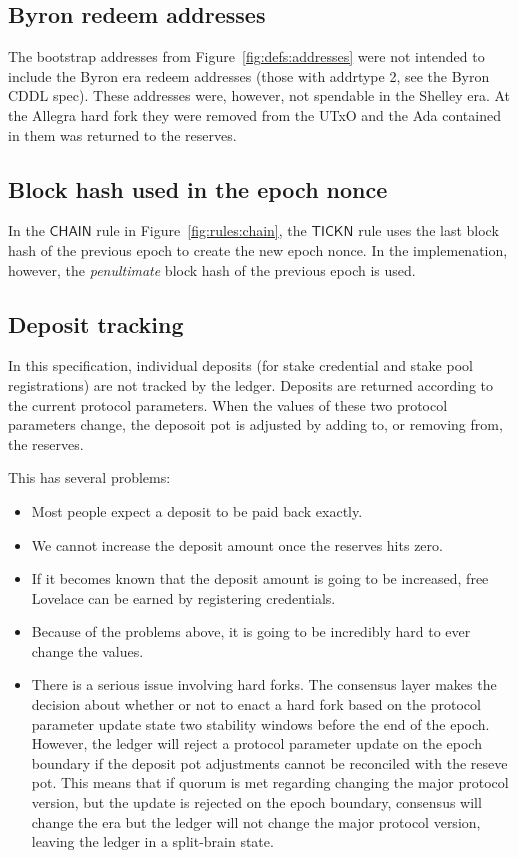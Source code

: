 \subsection{Byron redeem addresses}
\label{sec:errata:byron-redeem-addresses}

The bootstrap addresses from Figure~\ref{fig:defs:addresses} were not intended
to include the Byron era redeem addresses
(those with addrtype 2, see the Byron CDDL spec).
These addresses were, however, not spendable in the Shelley era.
At the Allegra hard fork they were removed from the UTxO
and the Ada contained in them was returned to the reserves.

\subsection{Block hash used in the epoch nonce}
\label{sec:block-hash-in-epoch-nonce}

In the $\mathsf{CHAIN}$ rule in Figure~\ref{fig:rules:chain}, the $\mathsf{TICKN}$ rule uses
the last block hash of the previous epoch to create the new epoch nonce.
In the implemenation, however, the \textit{penultimate} block hash of the previous epoch is used.

\subsection{Deposit tracking}
\label{sec:deposit-tracking}

In this specification, individual deposits (for stake credential and stake pool registrations) are not tracked by the ledger.
Deposits are returned according to the current protocol parameters.
When the values of these two protocol parameters change, the deposoit pot
is adjusted by adding to, or removing from, the reserves.

This has several problems:
\begin{itemize}
  \item Most people expect a deposit to be paid back exactly.
  \item We cannot increase the deposit amount once the reserves hits zero.
  \item If it becomes known that the deposit amount is going to be increased, free Lovelace can be earned by registering credentials.
  \item Because of the problems above, it is going to be incredibly hard to ever change the values.
  \item There is a serious issue involving hard forks.
        The consensus layer makes the decision about whether or not to enact a hard fork based on
	the protocol parameter update state two stability windows before the end of the epoch.
	However, the ledger will reject a protocol parameter update on the epoch boundary
	if the deposit pot adjustments cannot be reconciled with the reseve pot.
	This means that if quorum is met regarding changing the major protocol version,
	but the update is rejected on the epoch boundary, consensus will change the era but the
	ledger will not change the major protocol version, leaving the ledger in a split-brain state.
\end{itemize}

